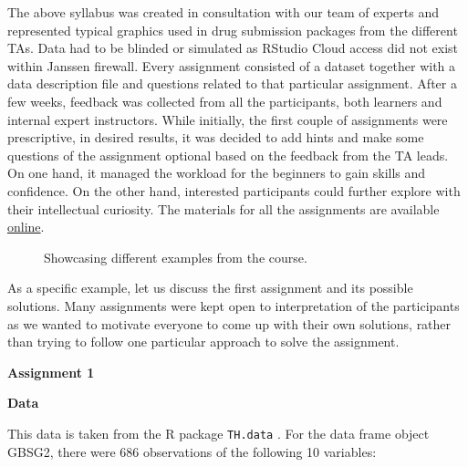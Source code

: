 The above syllabus was created in consultation with our team of experts
and represented typical graphics used in drug submission packages from
the different TAs. Data had to be blinded or simulated as RStudio Cloud
access did not exist within Janssen firewall. Every assignment consisted
of a dataset together with a data description file and questions related
to that particular assignment. After a few weeks, feedback was collected
from all the participants, both learners and internal expert
instructors. While initially, the first couple of assignments were
prescriptive, in desired results, it was decided to add hints and make
some questions of the assignment optional based on the feedback from the
TA leads. On one hand, it managed the workload for the beginners to gain
skills and confidence. On the other hand, interested participants could
further explore with their intellectual curiosity. The materials for all
the assignments are available
\href{https://github.com/rsengup4/GraphicsWithR}{online}.

\begin{figure}[htbp]
  \centering
  \caption{Showcasing different examples from the course.}
  \label{figure:picCollage}
\end{figure}

As a specific example, let us discuss the first assignment and its
possible solutions. Many assignments were kept open to interpretation of
the participants as we wanted to motivate everyone to come up with their
own solutions, rather than trying to follow one particular approach to
solve the assignment.

\noindent \textbf{Assignment 1}

\noindent \textbf{Data}

This data is taken from the R package \texttt{TH.data} \citep{Hothorn}.
For the data frame object GBSG2, there were 686 observations of the
following 10 variables:

